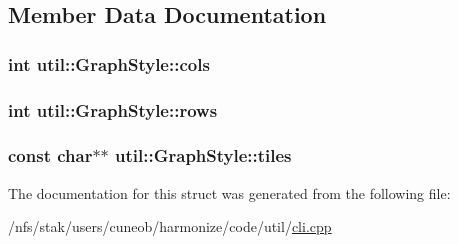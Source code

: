 \subsection{Member Data Documentation}
\hypertarget{structutil_1_1GraphStyle_af7d73a2d1331e043f9eb5d3251b9ce59}{
\subsubsection[{cols}]{\setlength{\rightskip}{0pt plus 5cm}int util\-::\-Graph\-Style\-::cols}}\label{structutil_1_1GraphStyle_af7d73a2d1331e043f9eb5d3251b9ce59}
\hypertarget{structutil_1_1GraphStyle_aeca8a7bdae634e682e1c48abbb9594d4}{
\subsubsection[{rows}]{\setlength{\rightskip}{0pt plus 5cm}int util\-::\-Graph\-Style\-::rows}}\label{structutil_1_1GraphStyle_aeca8a7bdae634e682e1c48abbb9594d4}
\hypertarget{structutil_1_1GraphStyle_a8439262d3b406194c8e7d0cf58747877}{
\subsubsection[{tiles}]{\setlength{\rightskip}{0pt plus 5cm}const char$\ast$$\ast$ util\-::\-Graph\-Style\-::tiles}}\label{structutil_1_1GraphStyle_a8439262d3b406194c8e7d0cf58747877}


The documentation for this struct was generated from the following file\-:\begin{DoxyCompactItemize}
\item 
/nfs/stak/users/cuneob/harmonize/code/util/\hyperlink{cli_8cpp}{cli.\-cpp}\end{DoxyCompactItemize}
